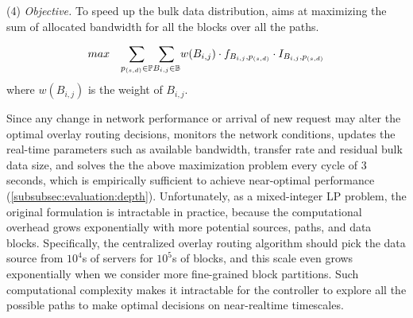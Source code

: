 
\noindent(4) {\em Objective.} To speed up the bulk data distribution, \name aims at maximizing the sum of allocated bandwidth for all the blocks over all the paths.

\begin{equation}
\centering
max \quad \displaystyle{\sum_{p_{(s,d)}\in \mathbb{P}}} \displaystyle{\sum_{B_{i,j} \in \mathbb{B}}} w(B_{i,j})\cdot f_{B_{i,j},p_{(s,d)}} \cdot I_{B_{i,j},p_{(s,d)}}
\label{equation:objective}
\end{equation}
where $w(B_{i,j})$ is the weight of $B_{i,j}$.

Since any change in network performance or arrival of
new request may alter the optimal overlay
routing decisions,
\name monitors the network conditions, updates the real-time parameters such as available bandwidth, transfer rate and residual bulk data size, and solves the the above maximization problem every cycle of 3 seconds, which is empirically sufficient to achieve near-optimal performance (\Section\ref{subsubsec:evaluation:depth}). Unfortunately, as a mixed-integer LP problem, the original formulation is intractable in practice, because the computational overhead grows exponentially with more potential sources, paths, and data blocks. Specifically, the centralized overlay routing algorithm should pick the data source from $10^4$s of servers for $10^5$s of blocks, and this scale even grows exponentially when we consider more fine-grained block partitions. Such computational complexity makes it intractable for the controller to explore all the possible paths to make optimal decisions on near-realtime timescales.

